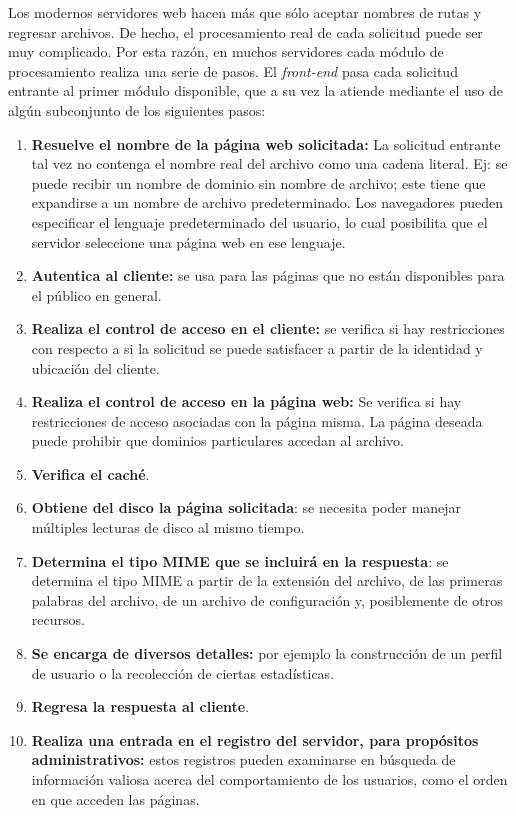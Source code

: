 \documentclass[10pt,a4paper]{report}
\begin{document}
				\par Los modernos servidores web hacen más que sólo aceptar nombres de rutas y regresar archivos. De hecho, el procesamiento real de cada solicitud puede ser muy complicado. Por esta razón, en muchos servidores cada módulo de procesamiento realiza una serie de pasos. El \textit{front-end} pasa cada solicitud entrante al primer módulo disponible, que a su vez la atiende mediante el uso de algún subconjunto de los siguientes pasos:
				
				\begin{enumerate}
					\item \textbf{Resuelve el nombre de la página web solicitada:} La solicitud entrante tal vez no contenga el nombre real del archivo como una cadena literal. Ej: se puede recibir un nombre de dominio sin nombre de archivo; este tiene que expandirse a un nombre de archivo predeterminado. Los navegadores pueden especificar el lenguaje predeterminado del usuario, lo cual posibilita que el servidor seleccione una página web en ese lenguaje.
					\item \textbf{Autentica al cliente:} se usa para las páginas que no están disponibles para el público en general.
					\item \textbf{Realiza el control de acceso en el cliente:} se verifica si hay restricciones con respecto a si la solicitud se puede satisfacer a partir de la identidad y ubicación del cliente.
					\item \textbf{Realiza el control de acceso en la página web:} Se verifica si hay restricciones de acceso asociadas con la página misma. La página deseada puede prohibir que dominios particulares accedan al archivo.
					\item \textbf{Verifica el caché}.
					\item \textbf{Obtiene del disco la página solicitada}: se necesita poder manejar múltiples lecturas de disco al mismo tiempo.
					\item \textbf{Determina el tipo MIME que se incluirá en la respuesta}: se determina el tipo MIME a partir de la extensión del archivo, de las primeras palabras del archivo, de un archivo de configuración y, posiblemente de otros recursos.
					\item \textbf{Se encarga de diversos detalles:} por ejemplo la construcción de un perfil de usuario o la recolección de ciertas estadísticas.
					\item \textbf{Regresa la respuesta al cliente}.
					\item \textbf{Realiza una entrada en el registro del servidor, para propósitos administrativos:} estos registros pueden examinarse en búsqueda de información valiosa acerca del comportamiento de los usuarios, como el orden en que acceden las páginas.
				\end{enumerate}
\end{document}
